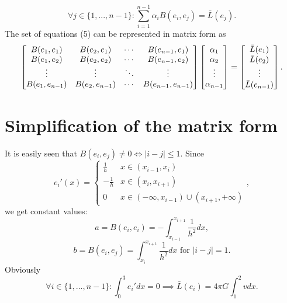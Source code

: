 \documentclass[12pt]{article}
\begin{document}
\begin{equation} \forall j \in \{1, ..., n-1\}: \sum_{i=1}^{n-1} \alpha_i B(e_i, e_j) = \bar L(e_j). \end{equation}
The set of equations (5) can be represented in matrix form as
\begin{equation}
  \begin{bmatrix}
	B(e_1, e_1) & B(e_2, e_1) & \cdots & B(e_{n-1}, e_1) \\
	B(e_1, e_2) &  B(e_2, e_2) & \cdots & B(e_{n-1}, e_2) \\
	\vdots  & \vdots  & \ddots & \vdots  \\
	B(e_1, e_{n-1}) &  B(e_2, e_{n-1}) & \cdots &  B(e_{n-1}, e_{n-1})
  \end{bmatrix}  
 \*
  \begin{bmatrix}
	\alpha_1 \\
	\alpha_2 \\
	\vdots \\
	\alpha_{n-1} \\
  \end{bmatrix}
=
  \begin{bmatrix}
	\bar L(e_1) \\
	\bar L(e_2) \\
	\vdots \\
	\bar L(e_{n-1}) \\
  \end{bmatrix}.
\end{equation}

\pagebreak[4]

\section{Simplification of the matrix form}


It is easily seen that $B(e_i, e_j) \neq 0 \iff |i-j| \leq 1$. Since 
\[e_i'(x) = 
  \begin{cases}
	\frac{1}{h} & x \in (x_{i-1}, x_i) \\
	- \frac{1}{h} & x \in (x_i, x_{i+1}) \\
	0 & x \in (-\infty, x_{i-1}) \cup (x_{i+1}, +\infty)
  \end{cases},\] 
we get constant values:
\[a = B(e_i, e_i) = - \int_{x_{i-1}}^{x_{i+1}} \frac{1}{h^2}dx,\]
\[b = B(e_i, e_j) = \int_{x_i}^{x_{i+1}} \frac{1}{h^2}dx \text{ for } |i-j| = 1.\]
Obviously
\[\forall i \in \{1, ..., n-1\}: \int_0^3 e_i'dx = 0 \implies \bar L(e_i) = 4 \pi G \int_1^2 v dx.\]
\end{document}
